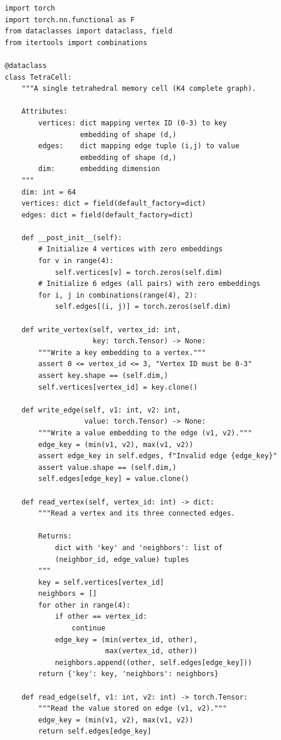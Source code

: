 \begin{lstlisting}[style=dogmapython, caption={Lab 4: TetraMemory cell implementation.}]
import torch
import torch.nn.functional as F
from dataclasses import dataclass, field
from itertools import combinations

@dataclass
class TetraCell:
    """A single tetrahedral memory cell (K4 complete graph).

    Attributes:
        vertices: dict mapping vertex ID (0-3) to key
                  embedding of shape (d,)
        edges:    dict mapping edge tuple (i,j) to value
                  embedding of shape (d,)
        dim:      embedding dimension
    """
    dim: int = 64
    vertices: dict = field(default_factory=dict)
    edges: dict = field(default_factory=dict)

    def __post_init__(self):
        # Initialize 4 vertices with zero embeddings
        for v in range(4):
            self.vertices[v] = torch.zeros(self.dim)
        # Initialize 6 edges (all pairs) with zero embeddings
        for i, j in combinations(range(4), 2):
            self.edges[(i, j)] = torch.zeros(self.dim)

    def write_vertex(self, vertex_id: int,
                     key: torch.Tensor) -> None:
        """Write a key embedding to a vertex."""
        assert 0 <= vertex_id <= 3, "Vertex ID must be 0-3"
        assert key.shape == (self.dim,)
        self.vertices[vertex_id] = key.clone()

    def write_edge(self, v1: int, v2: int,
                   value: torch.Tensor) -> None:
        """Write a value embedding to the edge (v1, v2)."""
        edge_key = (min(v1, v2), max(v1, v2))
        assert edge_key in self.edges, f"Invalid edge {edge_key}"
        assert value.shape == (self.dim,)
        self.edges[edge_key] = value.clone()

    def read_vertex(self, vertex_id: int) -> dict:
        """Read a vertex and its three connected edges.

        Returns:
            dict with 'key' and 'neighbors': list of
            (neighbor_id, edge_value) tuples
        """
        key = self.vertices[vertex_id]
        neighbors = []
        for other in range(4):
            if other == vertex_id:
                continue
            edge_key = (min(vertex_id, other),
                        max(vertex_id, other))
            neighbors.append((other, self.edges[edge_key]))
        return {'key': key, 'neighbors': neighbors}

    def read_edge(self, v1: int, v2: int) -> torch.Tensor:
        """Read the value stored on edge (v1, v2)."""
        edge_key = (min(v1, v2), max(v1, v2))
        return self.edges[edge_key]
\end{lstlisting}

